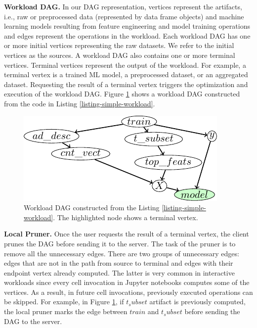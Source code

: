 \textbf{Workload DAG.}
In our DAG representation, vertices represent the artifacts, i.e., raw or preprocessed data (represented by data frame objects) and machine learning models resulting from feature engineering and model training operations and edges represent the operations in the workload.
Each workload DAG has one or more initial vertices representing the raw datasets.
We refer to the initial vertices as the sources.
A workload DAG also contains one or more terminal vertices.
Terminal vertices represent the output of the workload.
For example, a terminal vertex is a trained ML model, a preprocessed dataset, or an aggregated dataset.
Requesting the result of a terminal vertex triggers the optimization and execution of the workload DAG.
Figure \ref{fig-workload-dag} shows a workload DAG constructed from the code in Listing \ref{listing-simple-workload}.
\begin{figure}
\centering
\includegraphics[width=\linewidth]{../images/tikz-standalone/example-graph}
\caption{Workload DAG constructed from the Listing \ref{listing-simple-workload}. The highlighted node shows a terminal vertex.}
\label{fig-workload-dag}
\end{figure}

\textbf{Local Pruner.}
Once the user requests the result of a terminal vertex, the client prunes the DAG before sending it to the server.
The task of the pruner is to remove all the unnecessary edges.
There are two groups of unnecessary edges: edges that are not in the path from source to terminal and edges with their endpoint vertex already computed.
The latter is very common in interactive workloads since every cell invocation in Jupyter notebooks computes some of the vertices.
As a result, in future cell invocations, previously executed operations can be skipped.
For example, in Figure \ref{fig-workload-dag}, if $t_subset$ artifact is previously computed, the local pruner marks the edge between $train$ and $t_subset$ before sending the DAG to the server.

